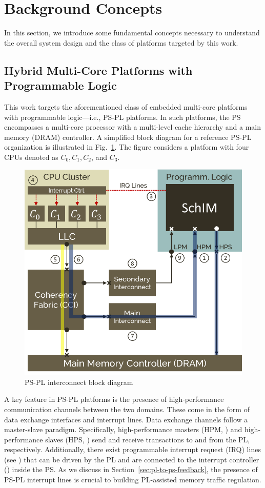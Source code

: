 \section{Background Concepts}

In this section, we introduce some fundamental concepts necessary to
understand the overall system design and the class of platforms
targeted by this work.

\subsection{Hybrid Multi-Core Platforms with Programmable Logic}
This work targets the aforementioned class of embedded multi-core
platforms with programmable logic---i.e., PS-PL platforms. In such
platforms, the PS encompasses a multi-core processor with a
multi-level cache hierarchy and a main memory (DRAM) controller.  A
simplified block diagram for a reference PS-PL organization is
illustrated in Fig.~\ref{fig:PS-PL-diagram}. The figure considers a
platform with four CPUs denoted as $C_0, C_1, C_2$, and $C_3$.

\begin{figure}[t]
  \centering
  \includegraphics[width=0.5\linewidth]{images/system_blocks.png}
  \caption{PS-PL interconnect block diagram}
  \label{fig:PS-PL-diagram}
\end{figure}

A key feature in PS-PL platforms is the presence of high-performance
communication channels between the two domains. These come in the form
of data exchange interfaces and interrupt lines. Data exchange
channels follow a master-slave paradigm. Specifically,
high-performance masters (HPM, ) and
high-performance slaves (HPS, ) send
and receive transactions to and from the PL,
respectively. Additionally, there exist programmable interrupt request
(IRQ) lines (see ) that can be driven
by the PL and are connected to the interrupt controller
() inside the PS. As we discuss in
Section~\ref{sec:pl-to-ps-feedback}, the presence of PS-PL interrupt
lines is crucial to building PL-assisted memory traffic regulation.

